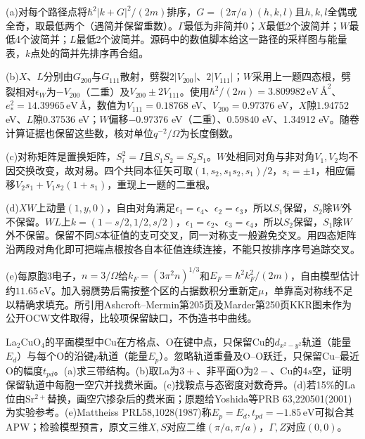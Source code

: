 \begin{solution}
(a)对每个路径点将$\hbar^2|k+G|^2/(2m)$排序，$G=(2\pi/a)(h,k,l)$且$h,k,l$全偶或全奇，取最低两个（遇简并保留重数）。$\Gamma$最低为非简并0；$X$最低2个波简并；$W$最低4个波简并；$L$最低2个波简并。源码中的数值脚本给这一路径的采样图与能量表，$k$点处的简并先排序再合组。

(b)$X$、$L$分别由$G_{200}$与$G_{111}$散射，劈裂$2|V_{200}|$、$2|V_{111}|$；$W$采用上一题四态根，劈裂相对$\epsilon_W$为$-V_{200}$（二重）及$V_{200}\pm2V_{111}$。使用$\hbar^2/(2m)=3.809982\,\mathrm{eV}\,\text{\AA}^{2}$、$e_*^2=14.39965\,\mathrm{eV}\,\text{\AA}$，数值为$V_{111}=0.18768$ eV、$V_{200}=0.97376$ eV，$X$隙1.94752 eV、$L$隙0.37536 eV；$W$偏移$-0.97376$ eV（二重）、0.59840 eV、1.34912 eV。随卷计算证据也保留这些数，核对单位$q^{-2}/\Omega$为长度倒数。

(c)对称矩阵是置换矩阵，$S_i^2=I$且$S_1S_2=S_2S_1$。$W$处相同对角与非对角$V_1,V_2$均不因交换改变，故对易。四个共同本征矢可取$(1,s_2,s_1s_2,s_1)/2$，$s_i=\pm1$，相应偏移$V_2s_1+V_1s_2(1+s_1)$，重现上一题的二重根。

(d)$XW$上动量$(1,y,0)$，自由对角满足$\epsilon_1=\epsilon_4$、$\epsilon_2=\epsilon_3$，所以$S_1$保留，$S_2$除$W$外不保留。$WL$上$k=(1-s/2,1/2,s/2)$，$\epsilon_1=\epsilon_2$、$\epsilon_3=\epsilon_4$，所以$S_2$保留，$S_1$除$W$外不保留。保留不同$S$本征值的支可交叉，同一对称支一般避免交叉。用四态矩阵沿两段对角化即可把端点根按各自本征值连续连接，不能只按排序序号追踪交叉。

(e)每原胞3电子，$n=3/\Omega$给$k_F=(3\pi^2n)^{1/3}$和$E_F=\hbar^2k_F^2/(2m)$，自由模型估计约$11.65\,\mathrm{eV}$。加入弱赝势后需按整个区的占据数积分重新定$\mu$，单靠高对称线不足以精确求填充。所引用Ashcroft--Mermin第205页及Marder第250页KKR图未作为公开OCW文件取得，比较项保留缺口，不伪造书中曲线。
\end{solution}

\begin{exercise}[原题1(a)--(e)]
La$_2$CuO$_4$的平面模型中Cu在方格点、O在键中点，只保留Cu的$d_{x^2-y^2}$轨道（能量$E_d$）与每个O的沿键$p$轨道（能量$E_p$）。忽略轨道重叠及O--O跃迁，只保留Cu--最近O的幅度$t_{pd}$。(a)求三带结构。(b)取La为$3+$、非平面O为$2-$、Cu的$4s$空，证明保留轨道中每胞一空穴并找费米面。(c)找鞍点与态密度对数奇异。(d)若15\%的La位由Sr$^{2+}$替换，画空穴掺杂后的费米面；原题给Yoshida等PRB 63,220501(2001)为实验参考。(e)Mattheiss PRL58,1028(1987)称$E_p=E_d,t_{pd}=-1.85\,\mathrm{eV}$可拟合其APW；检验模型预言，原文三维$X,S$对应二维$(\pi/a,\pi/a)$，$\Gamma,Z$对应$(0,0)$。
\end{exercise}

